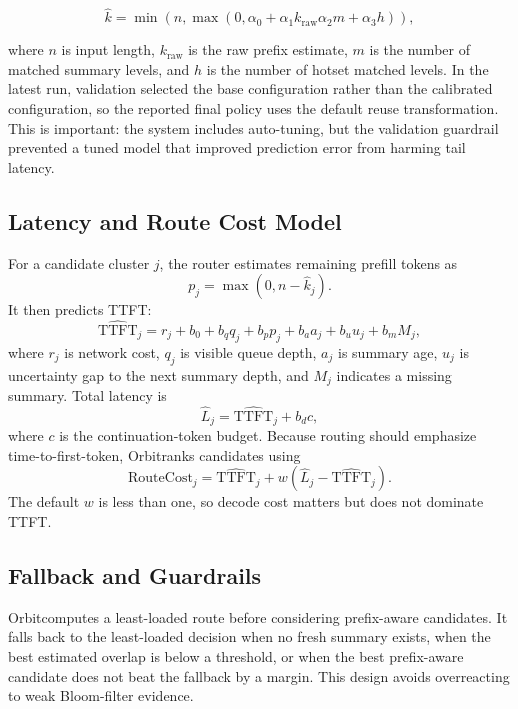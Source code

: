 \documentclass[10pt,twocolumn]{article}
\newcommand{\sys}{Orbit}
\begin{document}
\begin{equation}
\hat{k} =
\min\left(n, \max\left(0,
\alpha_0 + \alpha_1 k_{\mathrm{raw}}
 \alpha_2 m + \alpha_3 h
\right)\right),
\end{equation}

where $n$ is input length, $k_{\mathrm{raw}}$ is the raw prefix estimate, $m$ is the number of matched summary levels, and $h$ is the number of hotset matched levels. In the latest run, validation selected the base configuration rather than the calibrated configuration, so the reported final policy uses the default reuse transformation. This is important: the system includes auto-tuning, but the validation guardrail prevented a tuned model that improved prediction error from harming tail latency.

\subsection{Latency and Route Cost Model}

For a candidate cluster $j$, the router estimates remaining prefill tokens as
\begin{equation}
p_j = \max(0, n - \hat{k}_j).
\end{equation}
It then predicts TTFT:
\begin{equation}
\widehat{\mathrm{TTFT}}_j =
r_j + b_0 + b_q q_j + b_p p_j + b_a a_j + b_u u_j + b_m M_j,
\end{equation}
where $r_j$ is network cost, $q_j$ is visible queue depth, $a_j$ is summary age, $u_j$ is uncertainty gap to the next summary depth, and $M_j$ indicates a missing summary. Total latency is
\begin{equation}
\widehat{L}_j = \widehat{\mathrm{TTFT}}_j + b_d c,
\end{equation}
where $c$ is the continuation-token budget. Because routing should emphasize time-to-first-token, \sys ranks candidates using
\begin{equation}
\mathrm{RouteCost}_j = \widehat{\mathrm{TTFT}}_j
 + w(\widehat{L}_j - \widehat{\mathrm{TTFT}}_j).
\end{equation}
The default $w$ is less than one, so decode cost matters but does not dominate TTFT.

\subsection{Fallback and Guardrails}

\sys computes a least-loaded route before considering prefix-aware candidates. It falls back to the least-loaded decision when no fresh summary exists, when the best estimated overlap is below a threshold, or when the best prefix-aware candidate does not beat the fallback by a margin. This design avoids overreacting to weak Bloom-filter evidence.
\end{document}
